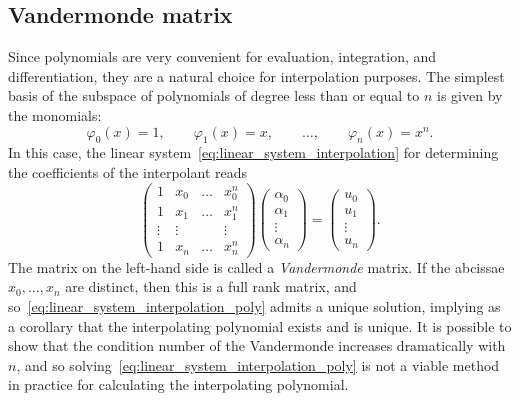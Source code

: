 \subsection{Vandermonde matrix}
Since polynomials are very convenient for evaluation, integration, and differentiation,
they are a natural choice for interpolation purposes.
The simplest basis of the subspace of polynomials of degree less than or equal to $n$ is given by the monomials:
\[
    \varphi_0(x) = 1,
    \qquad
    \varphi_1(x) = x,
    \qquad \dotsc, \qquad
    \varphi_n(x) = x^n.
\]
In this case,
the linear system~\eqref{eq:linear_system_interpolation} for determining the coefficients of the interpolant reads
\begin{equation}
    \label{eq:linear_system_interpolation_poly}
    \begin{pmatrix}
        1 & x_0 & \hdots & x_0^n \\
        1 & x_1 & \hdots & x_1^n \\
        \vdots & \vdots & & \vdots \\
        1 & x_n & \hdots & x_n^n
    \end{pmatrix}
    \begin{pmatrix}
        \alpha_0 \\
        \alpha_1 \\
        \vdots \\
        \alpha_n
    \end{pmatrix}
    =
    \begin{pmatrix}
        u_0 \\
        u_1 \\
        \vdots \\
        u_n
    \end{pmatrix}.
\end{equation}
The matrix on the left-hand side is called a \emph{Vandermonde} matrix.
If the abcissae $x_0, \dotsc, x_n$ are distinct,
then this is a full rank matrix,
and so~\eqref{eq:linear_system_interpolation_poly} admits a unique solution,
implying as a corollary that the interpolating polynomial exists and is unique.
It is possible to show that the condition number of the Vandermonde increases dramatically with $n$,
and so solving~\eqref{eq:linear_system_interpolation_poly} is not a viable method in practice for calculating the interpolating polynomial.

